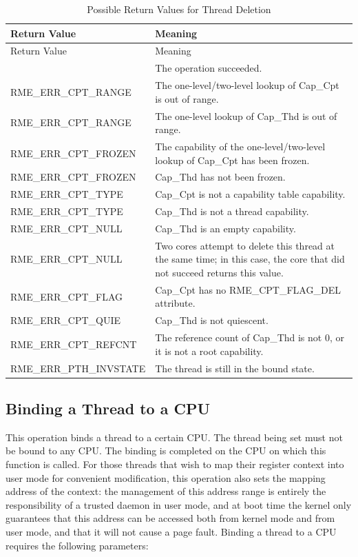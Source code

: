 \begin{xltabular}{\textwidth}{@{}>{\hsize\raggedright\arraybackslash}X>{\hsize\raggedright\arraybackslash}X@{}}
\caption{Possible Return Values for Thread Deletion}\label{tab:4-23-delete-thread-return-values}\\
\toprule
Return Value & Meaning\tabularnewline
\endfirsthead
\toprule
Return Value & Meaning\tabularnewline
\midrule
\endhead
\bottomrule
{} & The operation succeeded.\tabularnewline
    RME\_ERR\_CPT\_RANGE & The one-level/two-level lookup of Cap\_Cpt is out of range.\tabularnewline
    RME\_ERR\_CPT\_RANGE & The one-level lookup of Cap\_Thd is out of range.\tabularnewline
    RME\_ERR\_CPT\_FROZEN & The capability of the one-level/two-level lookup of Cap\_Cpt has been frozen.\tabularnewline
    RME\_ERR\_CPT\_FROZEN & Cap\_Thd has not been frozen.\tabularnewline
    RME\_ERR\_CPT\_TYPE & Cap\_Cpt is not a capability table capability.\tabularnewline
    RME\_ERR\_CPT\_TYPE & Cap\_Thd is not a thread capability.\tabularnewline
    RME\_ERR\_CPT\_NULL & Cap\_Thd is an empty capability.\tabularnewline
    RME\_ERR\_CPT\_NULL & Two cores attempt to delete this thread at the same time; in this case, the core that did not succeed returns this value.\tabularnewline
    RME\_ERR\_CPT\_FLAG & Cap\_Cpt has no RME\_CPT\_FLAG\_DEL attribute.\tabularnewline
    RME\_ERR\_CPT\_QUIE & Cap\_Thd is not quiescent.\tabularnewline
    RME\_ERR\_CPT\_REFCNT & The reference count of Cap\_Thd is not 0, or it is not a root capability.\tabularnewline
    RME\_ERR\_PTH\_INVSTATE & The thread is still in the bound state.\tabularnewline
\end{xltabular}
\nopagebreak[4]

\subsection{Binding a Thread to a CPU}\label{subsec:4-bind-a-thread-to-a-cpu}

This operation binds a thread to a certain CPU. The thread being set must not be bound to any CPU. The binding is completed on the CPU on which this function is called. For those threads that wish to map their register context into user mode for convenient modification, this operation also sets the mapping address of the context: the management of this address range is entirely the responsibility of a trusted daemon in user mode, and at boot time the kernel only guarantees that this address can be accessed both from kernel mode and from user mode, and that it will not cause a page fault. Binding a thread to a CPU requires the following parameters:


